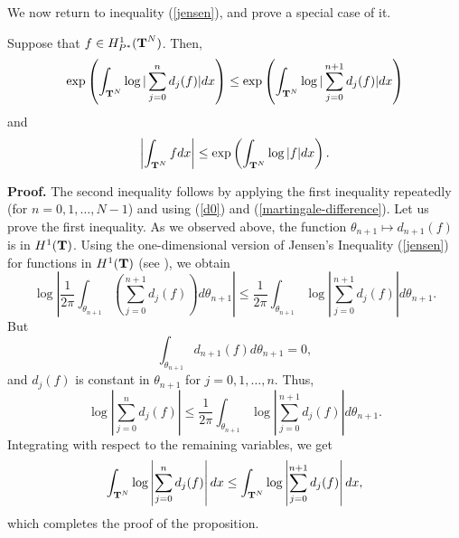 We now return to  
inequality (\ref{jensen}), and prove a special
case of it.
\begin{prop1}
Suppose that $f\in H^1_{P^*}(\T^N)$.  Then,
$$ \exp \left(\int_{\T^N}\log | \sum_{j=0}^n d_j(f) |dx\right)
   \le
   \exp \left(\int_{\T^N}\log | \sum_{j=0}^{n+1} d_j(f) |dx\right)$$
and
$$\left|\int_{\T^N}fdx\right|\leq 
	\exp \left(\int_{\T^N}\log |f|dx\right).$$
\label{prop1}
\end{prop1}
{\bf Proof.}  
The second inequality follows by applying the first inequality 
repeatedly (for $n=0,1,\ldots,N-1$) and using 
(\ref{d0}) and (\ref{martingale-difference}).
Let us prove the first inequality.  
As we observed above, the function
 $\theta_{n+1}\mapsto d_{n+1}(f)$ is in $H^1(\T)$.
Using the one-dimensional version of Jensen's Inequality
(\ref{jensen}) for functions in $H^1(\T)$ 
(see \cite[Inequality (3.2), and Theorem 3.11]{ka}), 
we obtain
$$ 
\log \left|\frac1{2\pi} \int_{\theta_{n+1}}
\left(\sum_{j=0}^{n+1}d_j(f)
\right) d\theta_{n+1}\right|
\leq
\frac1{2\pi} \int_{\theta_{n+1}}
\log \left|\sum_{j=0}^{n+1}d_j(f)\right| d\theta_{n+1}.$$
But 
$$
\int_{\theta_{n+1}}
d_{n+1}(f) d\theta_{n+1}=0,
$$
and $d_j(f)$ is constant in $\theta_{n+1}$ for $j=0,1,\ldots,n$.  
Thus,
$$ 
\log \left|
\sum_{j=0}^{n}d_j(f)
 \right|
\leq
\frac1{2\pi} \int_{\theta_{n+1}}
\log \left|\sum_{j=0}^{n+1}d_j(f)\right| d\theta_{n+1}.
$$
Integrating with respect to the remaining variables, we get
$$
\int_{\T^N}\log \left| \sum_{j=0}^{n} d_j(f) \right| dx
\leq
\int_{\T^N}\log \left| \sum_{j=0}^{n+1} d_j(f) \right| dx,
$$
which completes the proof of the proposition.

